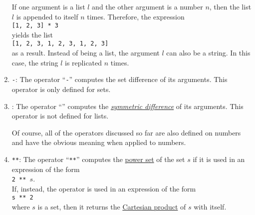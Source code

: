 \begin{enumerate}
      If one argument is a list $l$ and the other argument is a number $n$, then the list
      $l$ is appended to itself $n$ times.  Therefore, the expression
      \\[0.2cm]
      \hspace*{1.3cm}
      \texttt{[1, 2, 3] * 3}
      \\[0.2cm]
      yields the list
      \\[0.2cm]
      \hspace*{1.3cm}
      \texttt{[1, 2, 3, 1, 2, 3, 1, 2, 3]}
      \\[0.2cm]
      as a result.  Instead of being a list, the argument $l$ can also be a string.
      In this case, the string $l$ is replicated $n$ times.
\item \texttt{-}:  The operator ``\texttt{-}'' computes the set difference of its arguments.
      This operator is only defined for sets.
\item \texttt{}:  The operator ``\texttt{}'' computes the 
      \href{https://en.wikipedia.org/wiki/Symmetric_difference}{\emph{symmetric difference}} of its arguments.
      This operator is not defined for lists.

      Of course, all of the operators discussed so far are also defined on numbers and
      have the obvious meaning when applied to numbers.
\item \texttt{**}: The operator ``\texttt{**}'' computes the 
      \href{https://en.wikipedia.org/wiki/Power_set}{power set} of the set $s$ if it is used
      in an expression of the form
      \\
      \hspace*{1.3cm}
      \texttt{2 ** $s$}.
      \\[0.2cm]
      If, instead, the operator is used in an expression of the form
      \\[0.2cm]
      \hspace*{1.3cm}
      \texttt{s ** 2}
      \\[0.2cm]
      where $s$ is a set, then it returns the 
      \href{https://en.wikipedia.org/wiki/Cartesian_product}{Cartesian product} of $s$ with itself.


\end{enumerate}
